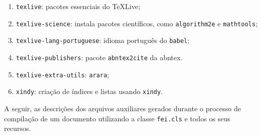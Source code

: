 \documentclass{fei}
\begin{document}
	\begin{enumerate}
	\item \texttt{texlive}: pacotes essenciais do \TeX Live;
	\item \texttt{texlive-science}: instala pacotes científicos, como \texttt{algorithm2e} e \texttt{mathtools};
	\item \texttt{texlive-lang-portuguese}: idioma português do \texttt{babel};
	\item \texttt{texlive-publishers}: pacote \texttt{abntex2cite} da \gls{abntex}.
	\item \texttt{texlive-extra-utils}: \texttt{arara};
	\item \texttt{xindy}: criação de índices e listas usando \texttt{xindy}.
	\end{enumerate}
	
	
	A seguir, as descrições dos arquivos auxiliares gerados durante o processo de compilação de um documento utilizando a classe \texttt{fei.cls} e todos os seus recursos.
	
\end{document}
